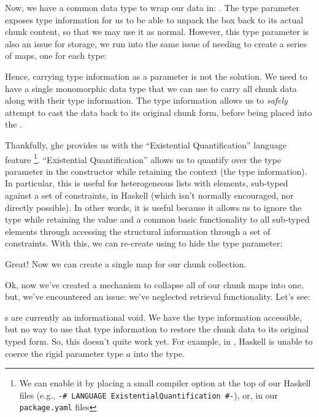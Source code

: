\badUniversalChunkCarriage{}

Now, we have a common data type to wrap our data in: \Chunk{}. The type
parameter exposes type information for us to be able to unpack the \Chunk{} box
back to its actual chunk content, so that we may use it as normal. However, this
type parameter is also an issue for storage, we run into the same issue of
needing to create a series of maps, one for each type:

\showingBadChunkWouldFailChunkDB{}

Hence, carrying type information as a parameter is not the solution. We need to
have a single monomorphic data type that we can use to carry all chunk data
along with their type information. The type information allows us to
\textit{safely} attempt to cast the data back to its original chunk form, before
being placed into the \ChunkDB{}.

Thankfully, \acs{ghc} provides us with the ``Existential Quantification''
language feature \cite{GHC2020ExistentialQuantification}\footnote{We can enable
it by placing a small compiler option at the top of our Haskell files (e.g.,
\texttt{{-# LANGUAGE ExistentialQuantification #-}}), or, in our
\texttt{package.yaml} files}. ``Existential Quantification'' allows us to
quantify over the type parameter in the \Chunk{} constructor while retaining the
context (the type information). In  particular, this is useful for heterogeneous
lists with elements, sub-typed against a set of constraints, in Haskell (which
isn't normally encouraged, nor directly possible). In other words, it is useful
because it allows us to ignore the type while retaining the value and a common
basic functionality to all sub-typed elements through accessing the structural
information through a set of constraints. With this, we can re-create \Chunk{}
using \ExistentialQuantification{} to hide the type parameter:

\voidDataChunks{}

Great! Now we can create a single map for our chunk collection.

\voidDataChunkDB{}

Ok, now we've created a mechanism to collapse all of our chunk maps into one,
but, we've encountered an issue: we've neglected retrieval functionality. Let's
see:

\brokenChunkRetriever{}

\Chunk{}s are currently an informational void. We have the type information
accessible, but no way to use that type information to restore the chunk data to
its original typed form. So, this doesn't quite work yet. For example, in
, Haskell is unable to coerce the rigid parameter type
\(a\) into the \QuantityDict{} type.


